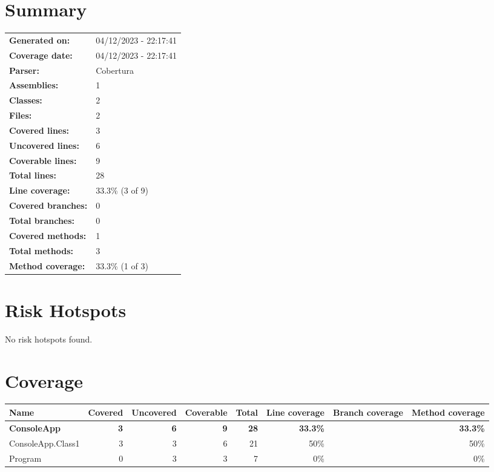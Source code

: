 \documentclass[a4paper,landscape,10pt]{article}
\begin{document}
\setcounter{secnumdepth}{-1}
\section{Summary}
\begin{longtable}[l]{ll}
\textbf{Generated on:} & 04/12/2023 - 22:17:41\\
\textbf{Coverage date:} & 04/12/2023 - 22:17:41\\
\textbf{Parser:} & Cobertura\\
\textbf{Assemblies:} & 1\\
\textbf{Classes:} & 2\\
\textbf{Files:} & 2\\
\textbf{Covered lines:} & 3\\
\textbf{Uncovered lines:} & 6\\
\textbf{Coverable lines:} & 9\\
\textbf{Total lines:} & 28\\
\textbf{Line coverage:} & 33.3\% (3 of 9)\\
\textbf{Covered branches:} & 0\\
\textbf{Total branches:} & 0\\
\textbf{Covered methods:} & 1\\
\textbf{Total methods:} & 3\\
\textbf{Method coverage:} & 33.3\% (1 of 3)\\
\end{longtable}
\section{Risk Hotspots}
No risk hotspots found.
\section{Coverage}
\begin{longtable}[l]{|l|r|r|r|r|r|r|r|}
\hline
\textbf{Name} & \textbf{Covered} & \textbf{Uncovered} & \textbf{Coverable} & \textbf{Total} & \textbf{Line coverage} & \textbf{Branch coverage} & \textbf{Method coverage}\\
\hline
\textbf{ConsoleApp} & \textbf{3} & \textbf{6} & \textbf{9} & \textbf{28} & \textbf{33.3\%} & \textbf{} & \textbf{33.3\%}\\
\hline
ConsoleApp.Class1 & 3 & 3 & 6 & 21 & 50\% &  & 50\%\\
\hline
Program & 0 & 3 & 3 & 7 & 0\% &  & 0\%\\
\hline
\end{longtable}
\newpage
\end{document}
